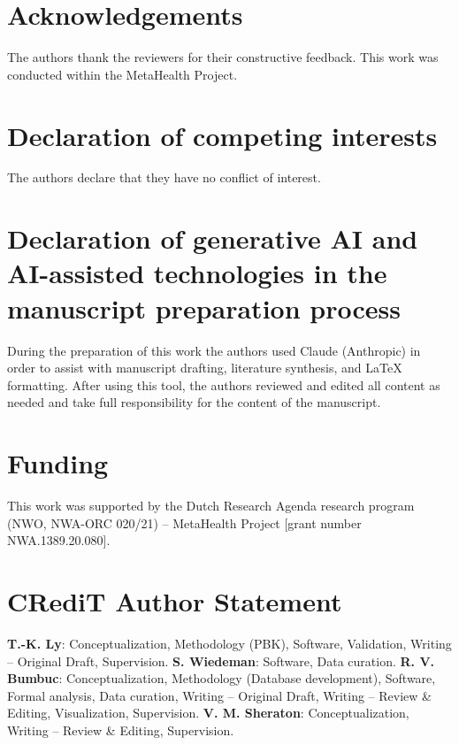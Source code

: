 \documentclass[preprint,12pt]{elsarticle}
\begin{document}
\begin{linenumbers}
\section*{Acknowledgements}
The authors thank the reviewers for their constructive feedback. This
work was conducted within the MetaHealth Project.


\section*{Declaration of competing interests}
The authors declare that they have no conflict of interest.

\section*{Declaration of generative AI and AI-assisted technologies in the manuscript preparation process}
During the preparation of this work the authors used Claude (Anthropic) in order to assist with manuscript drafting, literature synthesis, and LaTeX formatting. After using this tool, the authors reviewed and edited all content as needed and take full responsibility for the content of the manuscript.

\section*{Funding}
This work was supported by the Dutch Research Agenda research program
(NWO, NWA-ORC 020/21) -- MetaHealth Project [grant number
NWA.1389.20.080].

\section*{CRediT Author Statement}
\textbf{T.-K. Ly}: Conceptualization, Methodology (PBK), Software,
Validation, Writing -- Original Draft, Supervision.
\textbf{S. Wiedeman}: Software, Data curation.
\textbf{R. V. Bumbuc}: Conceptualization, Methodology (Database development), Software, Formal analysis, Data curation, Writing -- Original Draft, Writing -- Review \& Editing, Visualization, Supervision.
\textbf{V. M. Sheraton}: Conceptualization, Writing -- Review \&
Editing, Supervision.


\end{linenumbers}
\end{document}
